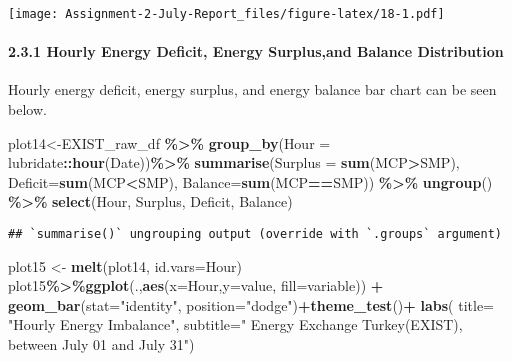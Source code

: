 \documentclass[
]{article}
\newenvironment{Shaded}{\begin{snugshade}}{\end{snugshade}}
\newcommand{\DataTypeTok}[1]{\textcolor[rgb]{0.13,0.29,0.53}{#1}}
\newcommand{\KeywordTok}[1]{\textcolor[rgb]{0.13,0.29,0.53}{\textbf{#1}}}
\newcommand{\NormalTok}[1]{#1}
\newcommand{\OperatorTok}[1]{\textcolor[rgb]{0.81,0.36,0.00}{\textbf{#1}}}
\newcommand{\StringTok}[1]{\textcolor[rgb]{0.31,0.60,0.02}{#1}}
\begin{document}
\texttt{[image: Assignment-2-July-Report\_files/figure-latex/18-1.pdf]}

\hypertarget{hourly-energy-deficit-energy-surplusand-balance-distribution}{%
\paragraph{2.3.1 Hourly Energy Deficit, Energy Surplus,and Balance
Distribution}\label{hourly-energy-deficit-energy-surplusand-balance-distribution}}

Hourly energy deficit, energy surplus, and energy balance bar chart can
be seen below.

\begin{Shaded}
\begin{Highlighting}[]
\NormalTok{plot14\textless{}{-}EXIST\_raw\_df }\OperatorTok{\%\textgreater{}\%}\StringTok{ }\KeywordTok{group\_by}\NormalTok{(}\DataTypeTok{Hour =}\NormalTok{ lubridate}\OperatorTok{::}\KeywordTok{hour}\NormalTok{(Date))}\OperatorTok{\%\textgreater{}\%}\StringTok{ }
\StringTok{  }\KeywordTok{summarise}\NormalTok{(}\DataTypeTok{Surplus =} \KeywordTok{sum}\NormalTok{(MCP}\OperatorTok{\textgreater{}}\NormalTok{SMP), }\DataTypeTok{Deficit=}\KeywordTok{sum}\NormalTok{(MCP}\OperatorTok{\textless{}}\NormalTok{SMP), }\DataTypeTok{Balance=}\KeywordTok{sum}\NormalTok{(MCP}\OperatorTok{==}\NormalTok{SMP)) }\OperatorTok{\%\textgreater{}\%}\StringTok{ }\KeywordTok{ungroup}\NormalTok{() }\OperatorTok{\%\textgreater{}\%}
\StringTok{  }\KeywordTok{select}\NormalTok{(Hour, Surplus, Deficit, Balance) }
\end{Highlighting}
\end{Shaded}

\begin{verbatim}
## `summarise()` ungrouping output (override with `.groups` argument)
\end{verbatim}

\begin{Shaded}
\begin{Highlighting}[]
\NormalTok{plot15 \textless{}{-}}\StringTok{ }\KeywordTok{melt}\NormalTok{(plot14, }\DataTypeTok{id.vars=}\StringTok{\textquotesingle{}Hour\textquotesingle{}}\NormalTok{)}
\NormalTok{plot15}\OperatorTok{\%\textgreater{}\%}\KeywordTok{ggplot}\NormalTok{(.,}\KeywordTok{aes}\NormalTok{(}\DataTypeTok{x=}\NormalTok{Hour,}\DataTypeTok{y=}\NormalTok{value, }\DataTypeTok{fill=}\NormalTok{variable)) }\OperatorTok{+}\StringTok{ }\KeywordTok{geom\_bar}\NormalTok{(}\DataTypeTok{stat=}\StringTok{"identity"}\NormalTok{, }\DataTypeTok{position=}\StringTok{"dodge"}\NormalTok{)}\OperatorTok{+}\KeywordTok{theme\_test}\NormalTok{()}\OperatorTok{+}
\StringTok{     }\KeywordTok{labs}\NormalTok{( }\DataTypeTok{title=}  \StringTok{"Hourly Energy Imbalance"}\NormalTok{,}
          \DataTypeTok{subtitle=}\StringTok{" Energy Exchange Turkey(EXIST), between July 01 and July 31"}\NormalTok{)}
\end{Highlighting}
\end{Shaded}
\end{document}
